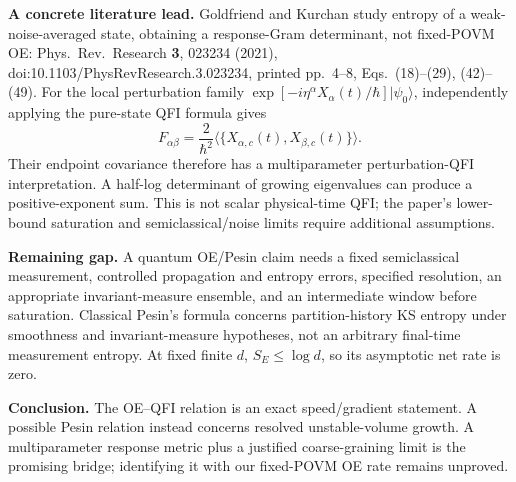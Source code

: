 \documentclass[11pt,a4paper]{article}
\begin{document}
\textbf{A concrete literature lead.} Goldfriend and Kurchan study entropy of a weak-noise-averaged state, obtaining a response-Gram determinant, not fixed-POVM OE: Phys.\ Rev.\ Research \textbf{3}, 023234 (2021), doi:10.1103/PhysRevResearch.3.023234, printed pp.~4--8, Eqs.~(18)--(29), (42)--(49). For the local perturbation family $\exp[-i\eta^\alpha X_\alpha(t)/\hbar]|\psi_0\rangle$, independently applying the pure-state QFI formula gives
\[F_{\alpha\beta}=\frac2{\hbar^2}\langle\{X_{\alpha,c}(t),X_{\beta,c}(t)\}\rangle.\]
Their endpoint covariance therefore has a multiparameter perturbation-QFI interpretation. A half-log determinant of growing eigenvalues can produce a positive-exponent sum. This is not scalar physical-time QFI; the paper's lower-bound saturation and semiclassical/noise limits require additional assumptions.

\textbf{Remaining gap.} A quantum OE/Pesin claim needs a fixed semiclassical measurement, controlled propagation and entropy errors, specified resolution, an appropriate invariant-measure ensemble, and an intermediate window before saturation. Classical Pesin's formula concerns partition-history KS entropy under smoothness and invariant-measure hypotheses, not an arbitrary final-time measurement entropy. At fixed finite $d$, $S_E\le\log d$, so its asymptotic net rate is zero.

\textbf{Conclusion.} The OE--QFI relation is an exact speed/gradient statement. A possible Pesin relation instead concerns resolved unstable-volume growth. A multiparameter response metric plus a justified coarse-graining limit is the promising bridge; identifying it with our fixed-POVM OE rate remains unproved.
\end{document}
